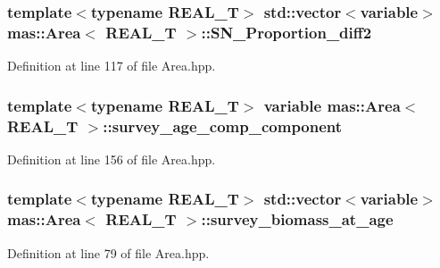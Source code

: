 \hypertarget{structmas_1_1_area_a0266b0fefd2b239bd153bd224081011c}{
\subsubsection[{S\-N\-\_\-\-Proportion\-\_\-diff2}]{\setlength{\rightskip}{0pt plus 5cm}template$<$typename R\-E\-A\-L\-\_\-\-T$>$ std\-::vector$<${\bf variable}$>$ {\bf mas\-::\-Area}$<$ R\-E\-A\-L\-\_\-\-T $>$\-::S\-N\-\_\-\-Proportion\-\_\-diff2}}\label{structmas_1_1_area_a0266b0fefd2b239bd153bd224081011c}


Definition at line 117 of file Area.\-hpp.

\hypertarget{structmas_1_1_area_ac9d145e72568af28ce8c973dffab11b3}{
\subsubsection[{survey\-\_\-age\-\_\-comp\-\_\-component}]{\setlength{\rightskip}{0pt plus 5cm}template$<$typename R\-E\-A\-L\-\_\-\-T$>$ {\bf variable} {\bf mas\-::\-Area}$<$ R\-E\-A\-L\-\_\-\-T $>$\-::survey\-\_\-age\-\_\-comp\-\_\-component}}\label{structmas_1_1_area_ac9d145e72568af28ce8c973dffab11b3}


Definition at line 156 of file Area.\-hpp.

\hypertarget{structmas_1_1_area_acaf171532a97cd7cd992779b02cce273}{
\subsubsection[{survey\-\_\-biomass\-\_\-at\-\_\-age}]{\setlength{\rightskip}{0pt plus 5cm}template$<$typename R\-E\-A\-L\-\_\-\-T$>$ std\-::vector$<${\bf variable}$>$ {\bf mas\-::\-Area}$<$ R\-E\-A\-L\-\_\-\-T $>$\-::survey\-\_\-biomass\-\_\-at\-\_\-age}}\label{structmas_1_1_area_acaf171532a97cd7cd992779b02cce273}


Definition at line 79 of file Area.\-hpp.

